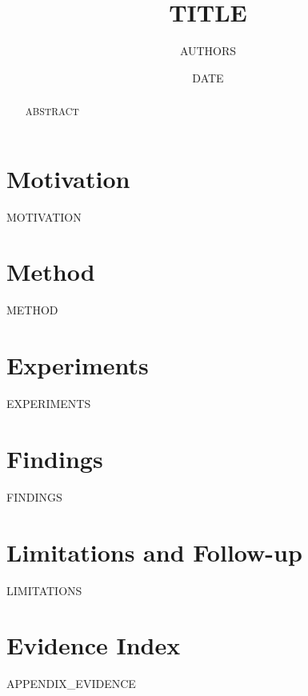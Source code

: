 \documentclass[11pt,a4paper]{article}
\title{ {{TITLE}} }
\author{ {{AUTHORS}} }
\date{ {{DATE}} }
\begin{document}
\maketitle

\begin{abstract}
{{ABSTRACT}}
\end{abstract}

\section{Motivation}
{{MOTIVATION}}

\section{Method}
{{METHOD}}

\section{Experiments}
{{EXPERIMENTS}}

\section{Findings}
{{FINDINGS}}

\section{Limitations and Follow-up}
{{LIMITATIONS}}

\appendix
\section{Evidence Index}
{{APPENDIX_EVIDENCE}}
\end{document}
